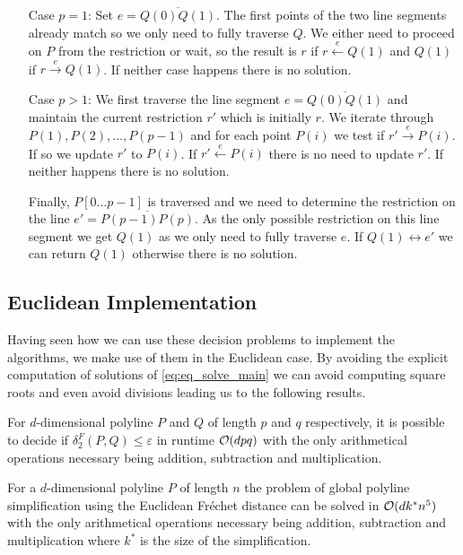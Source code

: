 \begin{itemize}
  \item[Case \(p = 1\): ] Set \(e = \overline{Q(0)Q(1)}\). The first points of the two line segments already match so we only need to fully traverse \(Q\). We either need to proceed on \(P\) from the restriction or wait, so the result is \(r\) if \(r \overset e\leftarrow Q(1)\) and \(Q(1)\) if \(r \overset e\rightarrow Q(1)\). If neither case happens there is no solution. 
  \item[Case \(p > 1\): ] We first traverse the line segment \(e = \overline{Q(0)Q(1)}\) and maintain the current restriction \(r'\) which is initially \(r\). We iterate through \(P(1), P(2), \dots, P(p-1)\) and for each point \(P(i)\) we test if \(r' \overset e\rightarrow P(i)\). If so we update \(r'\) to \(P(i)\). If \(r' \overset e\leftarrow P(i)\) there is no need to update \(r'\). If neither happens there is no solution. 

    Finally, \(P[0\dots p-1]\) is traversed and we need to determine the restriction on the line \(e'=\overline{P(p-1)P(p)}\). As the only possible restriction on this line segment we get \(Q(1)\) as we only need to fully traverse \(e\). If \(Q(1) \leftrightarrow e'\) we can return \(Q(1)\) otherwise there is no solution.
\end{itemize}


\subsection{Euclidean Implementation}
Having seen how we can use these decision problems to implement the algorithms, we make use of them in the Euclidean case. By avoiding the explicit computation of solutions of \cref{eq:eq_solve_main} we can avoid computing square roots and even avoid divisions leading us to the following results. 

\begin{theorem}
  For \(d\)-dimensional polyline \(P\) and \(Q\) of length \(p\) and \(q\) respectively, it is possible to decide if \(\delta_2^F(P, Q) \leq \varepsilon\) in runtime \(\mathcal{O}(d p q)\) with the only arithmetical operations necessary being addition, subtraction and multiplication. 
\end{theorem}

\begin{theorem}\label{thm:euclidean_implicit_simplification_simple}
  For a \(d\)-dimensional polyline \(P\) of length \(n\) the problem of global polyline simplification using the Euclidean Fréchet distance can be solved in \(\mathcal{O}(d k^*n^5)\) with the only arithmetical operations necessary being addition, subtraction and multiplication where \(k^*\) is the size of the simplification.
\end{theorem}

